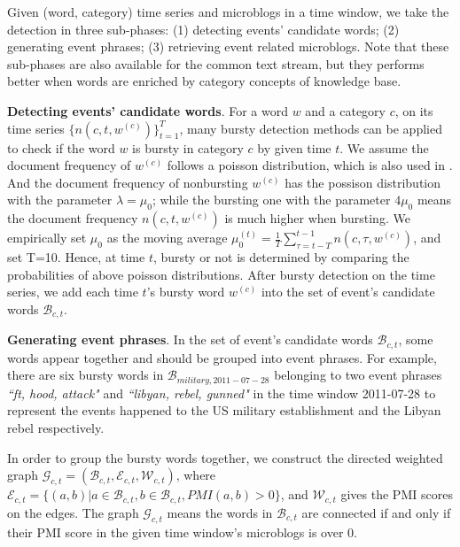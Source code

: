 \documentclass[runningheads,a4paper]{llncs}
\begin{document}
Given (word, category) time series and microblogs in a time window, we take the detection in	 three sub-phases: (1) detecting events' candidate words; (2) generating event phrases; (3) retrieving event related microblogs.
Note that these sub-phases are also available for the common text stream, but they performs better when words are enriched by category concepts of knowledge base.

\textbf{Detecting events' candidate words}. For a word \(w\) and a category \(c\), on its time series \(\{n(c,t,w^{(c)})\}_{t=1}^{T}\), many bursty detection methods can be applied to check if the word \(w\) is bursty in category \(c\) by given time \(t\). 
We assume the document frequency of \(w^{(c)}\) follows a poisson distribution, which is also used in \cite{Diao:2012wj}.
And the document frequency of nonbursting \(w^{(c)}\) has the possison distribution with the parameter \(\lambda=\mu_0\); while the bursting one with the parameter \(4\mu_0\) means the document frequency \(n(c,t,w^{(c)})\) is much higher when bursting.
We empirically set \(\mu_0\) as the moving average \(\mu_0^{(t)}=\frac{1}{T}\sum_{\tau=t-T}^{t-1}n(c,\tau,w^{(c)})\), and set T=10.
Hence, at time \(t\), bursty or not is determined by comparing the probabilities of above poisson distributions. 
After bursty detection on the time series, we add each time \(t\)'s bursty word \(w^{(c)}\) into the set of event's candidate words \(\mathcal{B}_{c,t}\).

\textbf{Generating event phrases}. 
In the set of event's candidate words \(\mathcal{B}_{c,t}\), some words appear together and should be grouped into event phrases.
For example, there are six bursty words in \(\mathcal{B}_{military,2011-07-28}\) belonging to two event phrases \textit{``ft, hood, attack"} and \textit{``libyan, rebel, gunned"} in the time window 2011-07-28 to represent the events happened to the US military establishment and the Libyan rebel respectively. 

In order to group the bursty words together, we  construct the directed weighted graph \(\mathcal{G}_{c,t}=(\mathcal{B}_{c,t},\mathcal{E}_{c,t},\mathcal{W}_{c,t})\), where \(\mathcal{E}_{c,t}=\{(a,b)|a \in \mathcal{B}_{c,t}, b \in \mathcal{B}_{c,t}, PMI(a,b)>0 \}\), and \(\mathcal{W}_{c,t}\) gives the PMI scores on the edges.
The graph \(\mathcal{G}_{c,t}\) means the words in \(\mathcal{B}_{c,t}\) are connected if and only if their PMI score in the given time window's microblogs is over 0. 
\end{document}
